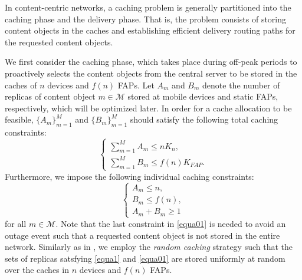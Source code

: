 \documentclass[10pt,journal,compsoc,onecolumn]{IEEEtran}
\begin{document}
In content-centric networks, a caching problem is generally
partitioned into the caching phase and the delivery phase. That
is, the problem consists of storing content objects in the caches
and establishing efficient delivery routing paths for the
requested content objects.

We first consider the caching phase, which takes place during off-peak periods to proactively selects the content objects from the central server to be stored in the caches of $n$ devices and $f(n)$ FAPs. Let $A_m$ and $B_m$ denote the number of replicas of content
object $m \in \mathcal{M}$ stored at mobile devices and static FAPs, respectively,
which will be optimized later. In order for a cache allocation to
be feasible, $\{A_m\}_{m=1}^M$ and $\{B_m\}_{m=1}^M$ should
satisfy the following total caching constraints:
\begin{equation}
\label{equa1}
\begin{cases}
   \sum_{m=1}^{M} A_m \leq nK_n, \\
   \sum_{m=1}^{M}B_m \leq f(n)K_{FAP}.
  \end{cases}
\end{equation}
Furthermore, we impose the following individual caching constraints:
\begin{equation}
\label{equa01}
\begin{cases}
    A_m \leq n,  \\
    B_m \leq f(n),  \\
  A_m+B_m \geq 1
  \end{cases}
\end{equation}
for all $m \in \mathcal{M}$. Note that the last constraint in
\eqref{equa01} is needed to avoid an outage event such that a
requested content object is not stored in the entire network.
Similarly as in \cite{c2,c3}, we employ the \textit{random
caching} strategy such that the sets of replicas satsfying
\eqref{equa1} and \eqref{equa01} are stored uniformly at random
over the caches in $n$ devices and $f(n)$ FAPs.
\end{document}

